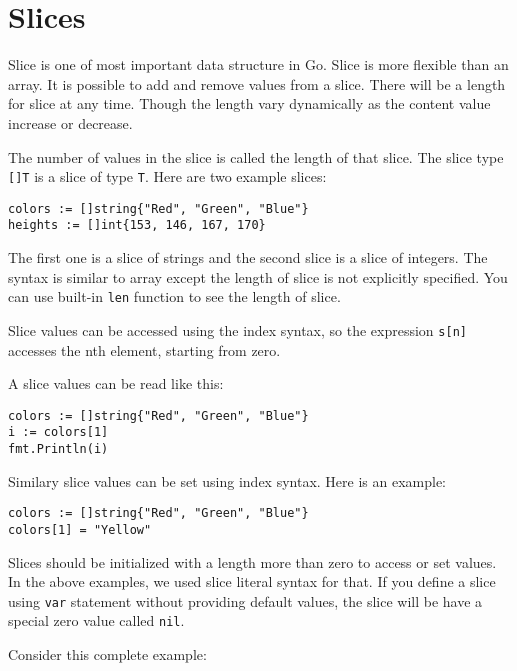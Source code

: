 \section{Slices}

Slice is one of most important data structure in Go.
Slice is more flexible than an array.  It is possible to add and
remove values from a slice.  There will be a length for slice at any
time.  Though the length vary dynamically as the content value
increase or decrease.

The number of values in the slice is called the length of that slice.
The slice type \texttt{[]T} is a slice of type \texttt{T}.  Here are
two example slices:

\begin{lstlisting}[numbers=none]
colors := []string{"Red", "Green", "Blue"}
heights := []int{153, 146, 167, 170}
\end{lstlisting}

The first one is a slice of strings and the second slice is a slice of
integers.  The syntax is similar to array except the length of slice
is not explicitly specified.  You can use built-in \texttt{len}
function to see the length of slice.

Slice values can be accessed using the index syntax, so the expression
\texttt{s[n]} accesses the nth element, starting from zero.

A slice values can be read like this:

\begin{lstlisting}[numbers=none]
colors := []string{"Red", "Green", "Blue"}
i := colors[1]
fmt.Println(i)
\end{lstlisting}

Similary slice values can be set using index syntax.  Here is an
example:

\begin{lstlisting}[numbers=none]
colors := []string{"Red", "Green", "Blue"}
colors[1] = "Yellow"
\end{lstlisting}

Slices should be initialized with a length more than zero to access or
set values.  In the above examples, we used slice literal syntax for
that.  If you define a slice using \texttt{var} statement without
providing default values, the slice will be have a special zero value
called \texttt{nil}.

Consider this complete example:




